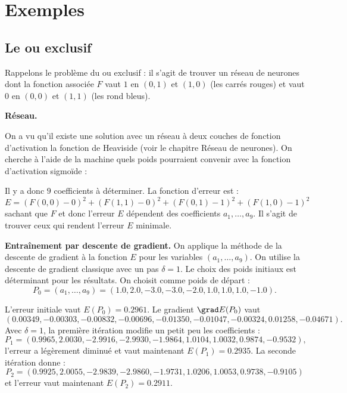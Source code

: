 
\section{Exemples}

\subsection{Le \og{}ou exclusif\fg{}}

Rappelons le problème du \og{}ou exclusif\fg{} : il s'agit de trouver un réseau de neurones dont la fonction associée $F$ vaut $1$ en $(0,1)$ et $(1,0)$ (les carrés rouges) et vaut $0$ en $(0,0)$ et $(1,1)$ (les rond bleus).


\textbf{Réseau.}

On a vu qu'il existe une solution avec un réseau à deux couches de fonction d'activation la fonction de Heaviside (voir le chapitre \og{}Réseau de neurones\fg{}).
On cherche à l'aide de la machine quels poids pourraient convenir avec la fonction d'activation sigmoïde :

Il y a donc $9$ coefficients à déterminer.
La fonction d'erreur est :
$$E = (F(0,0) - 0)^2 + (F(1,1) - 0)^2 + (F(0,1)-1)^2 + (F(1,0) - 1)^2$$
sachant que $F$ et donc l'erreur $E$ dépendent des coefficients $a_1,\ldots,a_9$.
Il s'agit de trouver ceux qui rendent l'erreur $E$ minimale.

\bigskip

\textbf{Entraînement par descente de gradient.}
On applique la méthode de la descente de gradient à la fonction $E$ pour les variables $(a_1,\ldots,a_9)$.
On utilise la descente de gradient classique avec un pas $\delta = 1$. 
Le choix des poids initiaux est déterminant pour les résultats.
On choisit comme poids de départ :
$$P_0 = (a_1,\ldots,a_9) = (1.0, 2.0, -3.0, -3.0, -2.0, 1.0, 1.0, 1.0, -1.0).$$


L'erreur initiale vaut $E(P_0) = 0.2961$.
Le gradient $\grad E(P_0)$ vaut 
$$(0.00349, -0.00303, -0.00832, -0.00696, -0.01350, -0.01047, -0.00324, 0.01258, -0.04671).$$
Avec $\delta = 1$, la première itération modifie un petit peu les coefficients :
$$P_1 = (0.9965, 2.0030, -2.9916, -2.9930, -1.9864, 1.0104, 1.0032, 0.9874, -0.9532),$$
l'erreur a légèrement diminué et vaut maintenant $E(P_1) = 0.2935$.
La seconde itération donne :
$$P_2 = (0.9925, 2.0055, -2.9839, -2.9860, -1.9731, 1.0206, 1.0053, 0.9738, -0.9105)$$
et l'erreur vaut maintenant $E(P_2) = 0.2911$.

